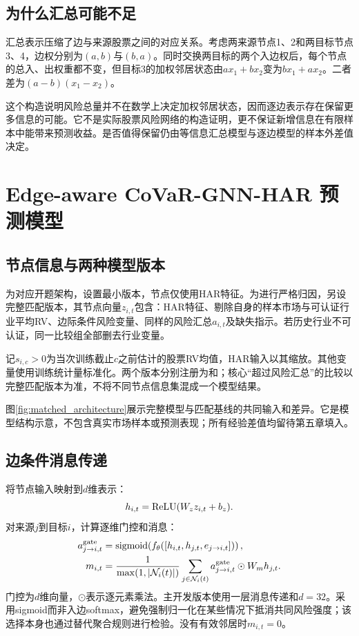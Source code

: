 \subsection{为什么汇总可能不足}
汇总表示压缩了边与来源股票之间的对应关系。考虑两来源节点1、2和两目标节点3、4，边权分别为$(a,b)$与$(b,a)$。同时交换两目标的两个入边权后，每个节点的总入、出权重都不变，但目标3的加权邻居状态由$ax_1+bx_2$变为$bx_1+ax_2$。二者差为$(a-b)(x_1-x_2)$。

这个构造说明风险总量并不在数学上决定加权邻居状态，因而逐边表示存在保留更多信息的可能。它不是实际股票风险网络的构造证明，更不保证新增信息在有限样本中能带来预测收益。是否值得保留仍由等信息汇总模型与逐边模型的样本外差值决定。

\section{Edge-aware CoVaR-GNN-HAR 预测模型}
\subsection{节点信息与两种模型版本}
为对应开题架构，设置最小版本，节点仅使用HAR特征。为进行严格归因，另设完整匹配版本，其节点向量$z_{i,t}$包含：HAR特征、剔除自身的样本市场与可认证行业平均RV、边际条件风险变量、同样的风险汇总$a_{i,t}$及缺失指示。若历史行业不可认证，同一比较组全部删去行业变量。

记$s_{i,c}>0$为当次训练截止$c$之前估计的股票RV均值，HAR输入以其缩放。其他变量使用训练统计量标准化。两个版本分别注册为和；核心“超过风险汇总”的比较以完整匹配版本为准，不将不同节点信息集混成一个模型结果。

图\ref{fig:matched_architecture}展示完整模型与匹配基线的共同输入和差异。它是模型结构示意，不包含真实市场样本或预测表现；所有经验差值均留待第五章填入。


\subsection{边条件消息传递}
将节点输入映射到$d$维表示：
\begin{equation}\label{eq:node_encoder}
h_{i,t}=\operatorname{ReLU}(W_z z_{i,t}+b_z).
\end{equation}
对来源$j$到目标$i$，计算逐维门控和消息：
\begin{align}
a_{j\to i,t}^{\mathrm{gate}}&=\operatorname{sigmoid}\!\left(f_{\theta}([h_{i,t},h_{j,t},e_{j\to i,t}])\right),\label{eq:gate}\\
m_{i,t}&=\frac1{\max(1,|\mathcal N_i(t)|)}
\sum_{j\in\mathcal N_i(t)}a_{j\to i,t}^{\mathrm{gate}}\odot W_mh_{j,t}.\label{eq:message}
\end{align}
门控为$d$维向量，$\odot$表示逐元素乘法。主开发版本使用一层消息传递和$d=32$。采用sigmoid而非入边softmax，避免强制归一化在某些情况下抵消共同风险强度；该选择本身也通过替代聚合规则进行检验。没有有效邻居时$m_{i,t}=0$。

